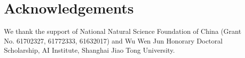 \documentclass[sigconf,screen,nonacm]{acmart} \usepackage{booktabs}
\begin{document}
	\section{Acknowledgements}
	We thank the support of National Natural Science Foundation of China (Grant No. 61702327, 61772333, 61632017) and Wu Wen Jun Honorary Doctoral Scholarship, AI Institute, Shanghai Jiao Tong University.
	




\balance

	
	
\end{document}
